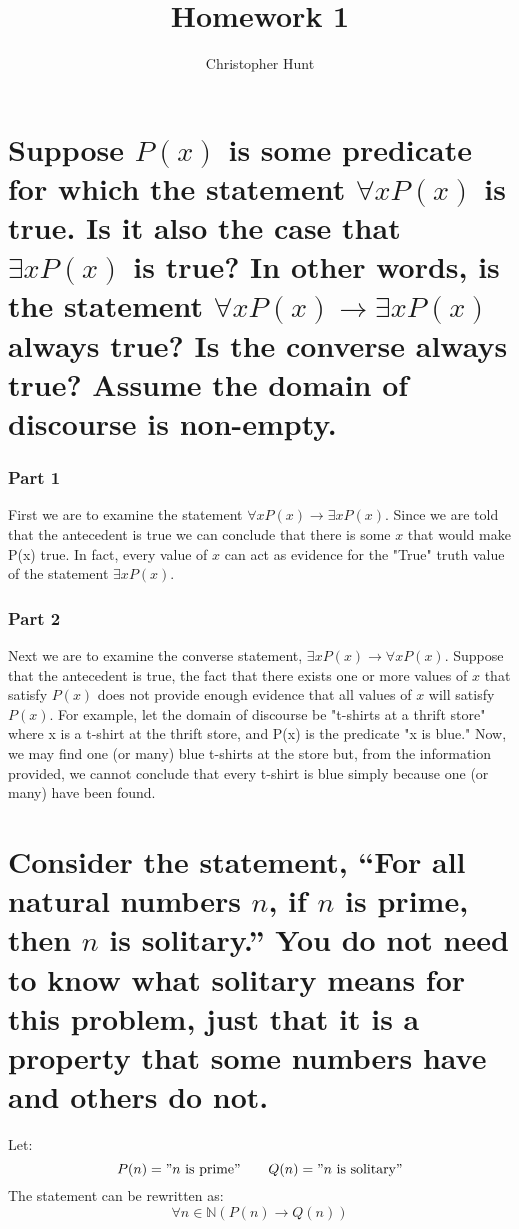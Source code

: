 \documentclass[11pt]{article}
\title{Homework 1}
\author{Christopher Hunt}
\date{}
\begin{document}
\pagestyle{fancy}
\fancyhf{}
\rhead{\thepage}
\maketitle
\section{Suppose $P(x)$ is some predicate for which the statement  $\forall x P(x)$ is true. Is it also the case that $\exists x P(x)$ is true? In other words, is the statement $\forall x P(x) \rightarrow \exists x P(x)$ always true? Is the converse always true? Assume the domain of discourse is non-empty.}

\subsubsection*{Part 1}
First we are to examine the statement $\forall x P(x) \rightarrow \exists x P(x)$. Since we are told that the antecedent is true we can conclude that there is some $x$ that would make P(x) true. In fact, every value of $x$ can act as evidence for the "True" truth value of the statement $\exists x P(x)$.

\subsubsection*{Part 2}
Next we are to examine the converse statement, $\exists x P(x) \rightarrow \forall x P(x)$. Suppose that the antecedent is true, the fact that there exists one or more values of $x$ that satisfy $P(x)$ does not provide enough evidence that all values of $x$ will satisfy $P(x)$. For example, let the domain of discourse be "t-shirts at a thrift store" where x is a t-shirt at the thrift store, and P(x) is the predicate "x is blue." Now, we may find one (or many) blue t-shirts at the store but, from the information provided, we cannot conclude that every t-shirt is blue simply because one (or many) have been found. 

\section{Consider the statement, “For all natural numbers $n$, if $n$ is prime, then $n$ is solitary.” You do not need to know what solitary means for this problem, just that it is a property that some numbers have and others do not.}

Let:
$$P(n) = "n \text{ is prime}" \qquad Q(n) = "n \text{ is solitary}"$$
The statement can be rewritten as:
$$\forall n \in \mathbb{N} (P(n) \rightarrow Q(n))$$
\end{document}
